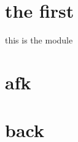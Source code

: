 
\section{the first}\label{sec:the-first}
\textrm{this is the module }

\clearpage
\section{afk}\label{sec:afk}


\clearpage
\section{back}\label{sec:back}

